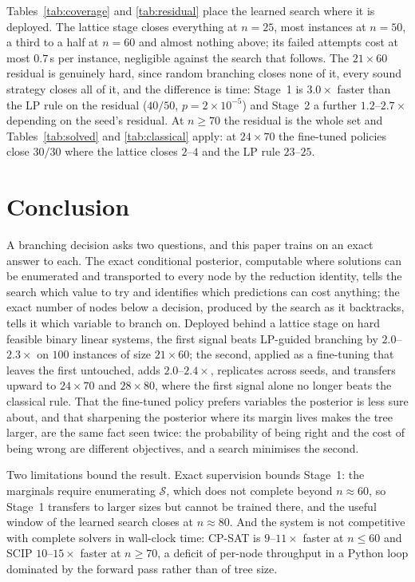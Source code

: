 \documentclass[final,5p,times,twocolumn,authoryear]{elsarticle}
\newcommand{\SOL}{\mathcal{S}}
\begin{document}
Tables~\ref{tab:coverage} and \ref{tab:residual} place the learned search where it is deployed. The lattice stage closes everything at $n=25$, most instances at $n=50$, a third to a half at $n=60$ and almost nothing above; its failed attempts cost at most $0.7$\,s per instance, negligible against the search that follows. The $21\times60$ residual is genuinely hard, since random branching closes none of it, every sound strategy closes all of it, and the difference is time: Stage~1 is $3.0\times$ faster than the LP rule on the residual ($40/50$, $p=2\times10^{-5}$) and Stage~2 a further $1.2$--$2.7\times$ depending on the seed's residual. At $n\ge70$ the residual is the whole set and Tables~\ref{tab:solved} and \ref{tab:classical} apply: at $24\times70$ the fine-tuned policies close $30/30$ where the lattice closes $2$--$4$ and the LP rule $23$--$25$.

\section{Conclusion}
\label{sec:conclusion}

A branching decision asks two questions, and this paper trains on an exact answer to each. The exact conditional posterior, computable where solutions can be enumerated and transported to every node by the reduction identity, tells the search which value to try and identifies which predictions can cost anything; the exact number of nodes below a decision, produced by the search as it backtracks, tells it which variable to branch on. Deployed behind a lattice stage on hard feasible binary linear systems, the first signal beats LP-guided branching by $2.0$--$2.3\times$ on $100$ instances of size $21\times60$; the second, applied as a fine-tuning that leaves the first untouched, adds $2.0$--$2.4\times$, replicates across seeds, and transfers upward to $24\times70$ and $28\times80$, where the first signal alone no longer beats the classical rule. That the fine-tuned policy prefers variables the posterior is less sure about, and that sharpening the posterior where its margin lives makes the tree larger, are the same fact seen twice: the probability of being right and the cost of being wrong are different objectives, and a search minimises the second.

Two limitations bound the result. Exact supervision bounds Stage~1: the marginals require enumerating $\SOL$, which does not complete beyond $n\approx60$, so Stage~1 transfers to larger sizes but cannot be trained there, and the useful window of the learned search closes at $n\approx80$. And the system is not competitive with complete solvers in wall-clock time: CP-SAT is $9$--$11\times$ faster at $n\le60$ and SCIP $10$--$15\times$ faster at $n\ge70$, a deficit of per-node throughput in a Python loop dominated by the forward pass rather than of tree size.
\end{document}
